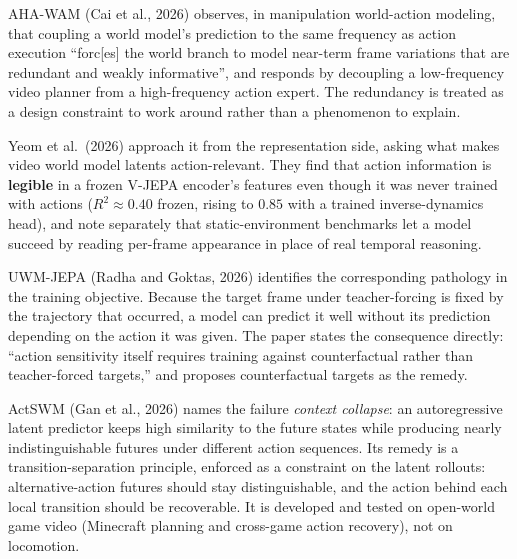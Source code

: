 \documentclass[12pt,a4paper,oneside]{report}
\begin{document}
AHA-WAM (Cai et al., 2026) observes, in manipulation world-action modeling, that coupling a world
model's prediction to the same frequency as action execution ``forc[es] the world branch to model
near-term frame variations that are redundant and weakly informative'', and responds by decoupling a
low-frequency video planner from a high-frequency action expert. The redundancy is treated as a design
constraint to work around rather than a phenomenon to explain.

Yeom et al.\ (2026) approach it from the representation side, asking what makes video world model
latents action-relevant. They find that action information is \textbf{legible} in a frozen V-JEPA
encoder's features even though it was never trained with actions ($R^2 \approx 0.40$ frozen, rising to
$0.85$ with a trained inverse-dynamics head), and note separately that static-environment benchmarks
let a model succeed by reading per-frame appearance in place of real temporal reasoning.

UWM-JEPA (Radha and Goktas, 2026) identifies the corresponding pathology in the training objective.
Because the target frame under teacher-forcing is fixed by the trajectory that occurred, a
model can predict it well without its prediction depending on the action it was given. The paper
states the consequence directly: ``action sensitivity itself requires training against counterfactual
rather than teacher-forced targets,'' and proposes counterfactual targets as the remedy.

ActSWM (Gan et al., 2026) names the failure \emph{context collapse}: an autoregressive latent predictor keeps
high similarity to the future states while producing nearly indistinguishable futures under different action
sequences. Its remedy is a transition-separation principle, enforced as a constraint on the latent rollouts:
alternative-action futures should stay distinguishable, and the action behind each local transition should be
recoverable. It is developed and tested on open-world game video (Minecraft planning and cross-game action
recovery), not on locomotion.
\end{document}
